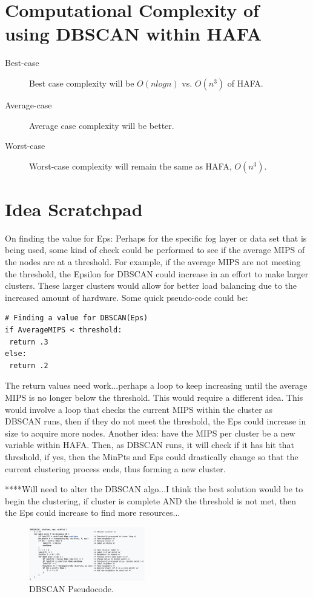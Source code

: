 \documentclass[letterpaper,twocolumn,10pt]{article}
\begin{document}
\section{Computational Complexity of using DBSCAN within HAFA}

\begin{description}
\item[Best-case] Best case complexity will be $O (n log n)$ vs. $O(n^3)$ of HAFA.
\item[Average-case] Average case complexity will be better.
\item[Worst-case] Worst-case complexity will remain the same as HAFA, $O(n^3)$.
\end{description}

\section{Idea Scratchpad}
On finding the value for Eps:
Perhaps for the specific fog layer or data set that is being used, some kind of check could be performed to see if the average MIPS of the nodes are at a threshold. For example, if the average MIPS are not meeting the threshold, the Epsilon for DBSCAN could increase in an effort to make larger clusters. These larger clusters would allow for better load balancing due to the increased amount of hardware. Some quick pseudo-code could be:
\begin{verbatim}
# Finding a value for DBSCAN(Eps)
if AverageMIPS < threshold:
 return .3
else:
 return .2
\end{verbatim}
 The return values need work...perhaps a loop to keep increasing until the average MIPS is no longer below the threshold. This would require a different idea. This would involve a loop that checks the current MIPS within the cluster as DBSCAN runs, then if they do not meet the threshold, the Eps could increase in size to acquire more nodes. Another idea: have the MIPS per cluster be a new variable within HAFA. Then, as DBSCAN runs, it will check if it has hit that threshold, if yes, then the MinPts and Eps could drastically change so that the current clustering process ends, thus forming a new cluster.
 
 ****Will need to alter the DBSCAN algo...I think the best solution would be to begin the clustering, if cluster is complete AND the threshold is not met, then the Eps could increase to find more resources...

\begin{figure}[h]
\centering
\includegraphics[width=0.45\textwidth]{pseudocode}
\caption{\label{fig:pseudocode}DBSCAN Pseudocode.}
\end{figure}



\end{document}
